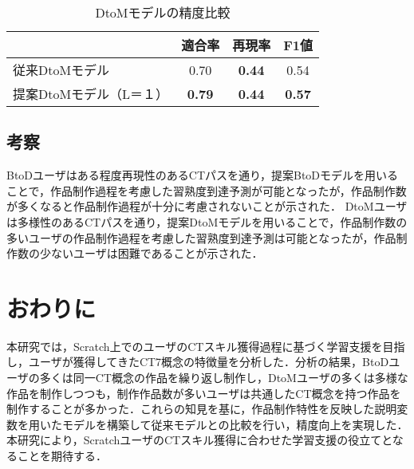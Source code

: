 \documentclass[twocolumn]{jarticle} %
\begin{document}
\begin{table}
  \caption{DtoMモデルの精度比較}
  \label{tab:dtom-model-comp}
  \vspace{2mm}
  \centering
  \begin{tabular}{l|c|c|c}
    \hline
     & 適合率 & 再現率 & F1値 \\
    \hline
    \hline
    従来DtoMモデル & 0.70 & \textbf{0.44} & 0.54\\
    \hline
    提案DtoMモデル（L＝１） & \textbf{0.79} & \textbf{0.44} & \textbf{0.57}\\
    \hline
  \end{tabular}
\end{table}

\subsection{考察}
BtoDユーザはある程度再現性のあるCTパスを通り，提案BtoDモデルを用いることで，作品制作過程を考慮した習熟度到達予測が可能となったが，作品制作数が多くなると作品制作過程が十分に考慮されないことが示された．
DtoMユーザは多様性のあるCTパスを通り，提案DtoMモデルを用いることで，作品制作数の多いユーザの作品制作過程を考慮した習熟度到達予測は可能となったが，作品制作数の少ないユーザは困難であることが示された．

\section{おわりに}

本研究では，Scratch上でのユーザのCTスキル獲得過程に基づく学習支援を目指し，ユーザが獲得してきたCT7概念の特徴量を分析した．分析の結果，BtoDユーザの多くは同一CT概念の作品を繰り返し制作し，DtoMユーザの多くは多様な作品を制作しつつも，制作作品数が多いユーザは共通したCT概念を持つ作品を制作することが多かった．これらの知見を基に，作品制作特性を反映した説明変数を用いたモデルを構築して従来モデルとの比較を行い，精度向上を実現した．本研究により，ScratchユーザのCTスキル獲得に合わせた学習支援の役立てとなることを期待する．







\end{document}
